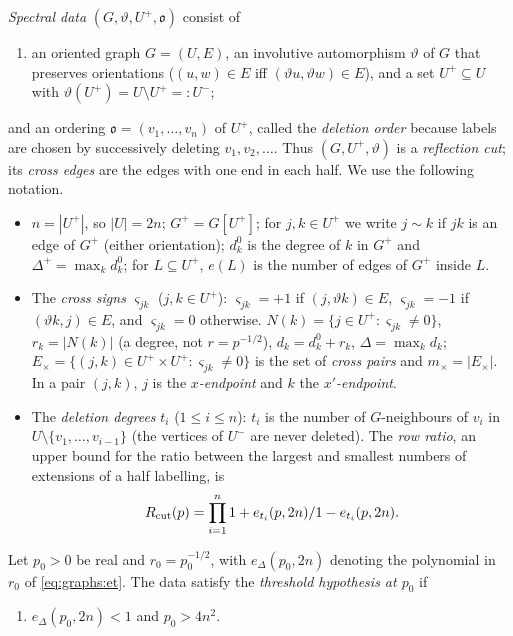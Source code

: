 \begin{definition}\label{def:spec:data}
\emph{Spectral data} $(G,\vartheta,U^+,\mathfrak o)$ consist of
\begin{enumerate}[label=\textup{(S0)},leftmargin=*]
\item an oriented graph $G=(U,E)$, an involutive automorphism $\vartheta$ of
  $G$ that preserves orientations ($(u,w)\in E$ iff
  $(\vartheta u,\vartheta w)\in E$), and a set $U^+\subseteq U$ with
  $\vartheta(U^+)=U\setminus U^+=:U^-$;
\end{enumerate}
and an ordering $\mathfrak o=(v_1,\dots,v_n)$ of $U^+$, called
the \emph{deletion order} because labels are chosen by
successively deleting $v_1,v_2,\dots$. Thus
$(G,U^+,\vartheta)$ is a \emph{reflection cut}; its \emph{cross edges} are the
edges with one end in each half. We use the following notation.
\begin{itemize}
\item $n=|U^+|$, so $|U|=2n$; $G^+=G[U^+]$; for $j,k\in U^+$ we write
  $j\sim k$ if $jk$ is an edge of $G^+$ (either orientation); $d^0_k$ is the
  degree of $k$ in $G^+$ and $\Delta^+=\max_kd^0_k$; for $L\subseteq U^+$,
  $e(L)$ is the number of edges of $G^+$ inside $L$.
\item The \emph{cross signs} $\varsigma_{jk}$ ($j,k\in U^+$):
  $\varsigma_{jk}=+1$ if $(j,\vartheta k)\in E$, $\varsigma_{jk}=-1$ if
  $(\vartheta k,j)\in E$, and $\varsigma_{jk}=0$ otherwise.
  $N(k)=\{j\in U^+:\varsigma_{jk}\ne0\}$, $r_k=|N(k)|$ (a degree,
  not $r=p^{-1/2}$), $d_k=d^0_k+r_k$,
  $\Delta=\max_kd_k$; $E_\times=\{(j,k)\in U^+\times U^+:\varsigma_{jk}\ne0\}$
  is the set of \emph{cross pairs} and $m_\times=|E_\times|$. In a pair $(j,k)$,
  $j$ is the \emph{$x$-endpoint} and $k$ the \emph{$x'$-endpoint}.
\item The \emph{deletion degrees} $t_i$ ($1\le i\le n$): $t_i$ is the number of
  $G$-neighbours of $v_i$ in $U\setminus\{v_1,\dots,v_{i-1}\}$ (the vertices of
  $U^-$ are never deleted). The \emph{row ratio}, an upper bound for the ratio between the largest and smallest numbers of extensions of a half labelling, is
  \begin{equation}\label{eq:spec:Rcut}
    R_{\mathrm{cut}}(p)=\prod_{i=1}^n1+e_{t_i}(p,2n)/1-e_{t_i}(p,2n) .
  \end{equation}
\end{itemize}
Let $p_0>0$ be real and $r_0=p_0^{-1/2}$, with $e_\Delta(p_0,2n)$ denoting the polynomial in $r_0$ of \eqref{eq:graphs:et}. The data satisfy the \emph{threshold
hypothesis at $p_0$} if
\begin{enumerate}[label=\textup{(S1)},leftmargin=*]
\item $e_\Delta(p_0,2n)<1$ and $p_0>4n^2$.
\end{enumerate}
\end{definition}

